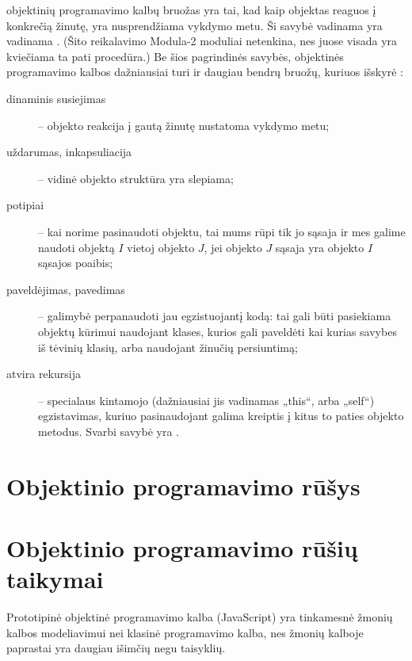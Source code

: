 objektinių programavimo kalbų bruožas yra tai, kad kaip objektas
reaguos į konkrečią žinutę, yra nusprendžiama vykdymo metu.
Ši savybė vadinama yra vadinama 
. (Šito reikalavimo Modula-2
moduliai netenkina, nes juose visada yra kviečiama ta pati procedūra.)
Be šios pagrindinės savybės, objektinės programavimo kalbos
dažniausiai turi ir daugiau bendrų bruožų, kuriuos išskyrė
\cite[225-227]{types-and-programming-languages}:
\begin{description}
  \item[dinaminis susiejimas]  –
    objekto reakcija į gautą žinutę nustatoma vykdymo metu;
  \item[uždarumas, inkapsuliacija]  – vidinė objekto
    struktūra yra slepiama;
  \item[potipiai]  – kai norime pasinaudoti objektu, 
    tai mums rūpi tik jo sąsaja ir mes galime naudoti objektą $I$ vietoj
    objekto $J$, jei objekto $J$ sąsaja yra objekto $I$ sąsajos poaibis;
  \item[paveldėjimas, pavedimas]  – galimybė
    perpanaudoti jau egzistuojantį kodą: tai gali būti pasiekiama
    objektų kūrimui naudojant klases, kurios gali paveldėti kai kurias
    savybes iš tėvinių klasių, arba naudojant žinučių persiuntimą;
  \item[atvira rekursija]  – specialaus kintamojo
    (dažniausiai jis vadinamas „this“, arba „self“) egzistavimas, kuriuo
    pasinaudojant galima kreiptis į kitus to paties objekto metodus.
    Svarbi savybė yra .
\end{description}


\section{Objektinio programavimo rūšys}

\section{Objektinio programavimo rūšių taikymai}

Prototipinė objektinė programavimo kalba (JavaScript) yra tinkamesnė
žmonių kalbos modeliavimui nei klasinė programavimo kalba, nes
žmonių kalboje paprastai yra daugiau išimčių negu taisyklių.

